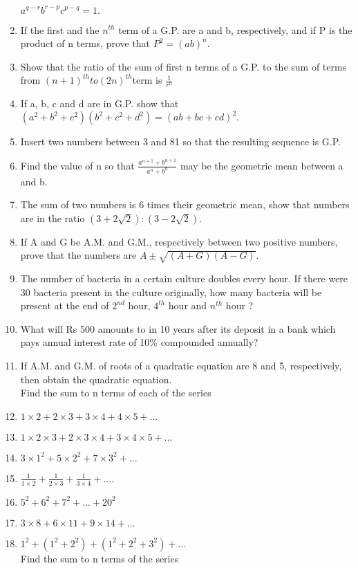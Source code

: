\begin{enumerate}[label=\arabic*.,ref=\thesubsection.\theenumi]
$a^{q-r} b^{r-p} c^{p-q} = 1.$
\item If the first and the $n^{th}$ term of a G.P. are a and b, respectively, and if P is the product of n terms, prove that $P^2 = (ab)^n.$
\item Show that the ratio of the sum of first n terms of a G.P. to the sum of terms from $(n+1)^{th} to (2n)^{th}$term is $\frac{1}{r^n}$
\item If a, b, c and d are in G.P. show that $(a^2 + b^2 + c^2)(b^2 + c^2 + d^2) = (ab + bc + cd)^2.$
\item Insert two numbers between 3 and 81 so that the resulting sequence is G.P.
\item Find the value of n so that $\frac{a^{n + 1} + b^{n + 1}}{a^n + b^n}$ may be the geometric mean between a and b.
\item The sum of two numbers is 6 times their geometric mean, show that numbers are in the ratio $(3+2\sqrt{2}):(3-2\sqrt{2}).$
\item If A and G be A.M. and G.M., respectively between two positive numbers, prove that the numbers are $A\pm \sqrt{(A+G)(A-G)}.$
\item The number of bacteria in a certain culture doubles every hour. If there were 30 bacteria present in the culture originally, how many bacteria will be present at the end of $2^{nd}$ hour, 
$4^{th}$ hour and $n^{th}$ hour ?
\item What will Rs 500 amounts to in 10 years after its deposit in a bank which pays annual interest rate of 10\% compounded annually?
\item If A.M. and G.M. of roots of a quadratic equation are 8 and 5, respectively, then obtain the quadratic equation.\\
Find the sum to n terms of each of the series
\item $1 \times 2 + 2 \times 3 + 3 \times 4 + 4 \times 5 +...$
\item $1 \times 2 \times 3 + 2 \times 3 \times 4 + 3 \times 4 \times 5 + ...$
\item $3 \times 1^2 + 5 \times 2^2 + 7 \times 3^2 + ...$
\item $\frac{1}{1 \times 2}+\frac{1}{2\times3}+\frac{1}{3\times4}+....$
\item $5^2 + 6^2 + 7^2 + ... + 20^2$
\item $3 \times 8 + 6 \times 11 + 9 \times 14 + ...$
\item $1^2 + (1^2 + 2^2 ) + (1^2 + 2^2 + 3^2 ) + ...$\\
Find the sum to n terms of the series

\end{enumerate}
